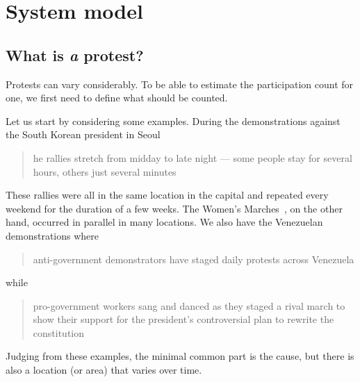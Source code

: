 \mode*

\section{System model}%
\label{SystemModel}

\subsection{What is \protect\emph{a} protest?}%
\label{WhatIsAProtest}

Protests can vary considerably.
To be able to estimate the participation count for one, we first need to define
what should be counted.

Let us start by considering some examples.
During the demonstrations against the South Korean president in Seoul
\blockcquote{2016DemonstrationsInSeoul}{%
  he rallies stretch from midday to late night --- some 
  people stay for several hours, others just several minutes%
}.
These rallies were all in the same location in the capital and repeated every 
weekend for the duration of a few weeks.
The Women's Marches~\cite{2017WomensMarchesInUS}, on the other hand, occurred 
in parallel in many locations.
We also have the Venezuelan demonstrations where
\blockcquote{2017VenezuelaProtestFrequency}{%
  anti-government demonstrators have staged daily protests across Venezuela%
} while
\blockcquote{AlJazeeraOnVenezuela2017}{%
  pro-government workers sang and danced as they staged a rival march to show 
  their support for the president's controversial plan to rewrite the 
  constitution%
}.
Judging from these examples, the minimal common part is the cause,%
\label{CauseIsTheCommonDenominator}
but there is also a location (or area) that varies over time.


